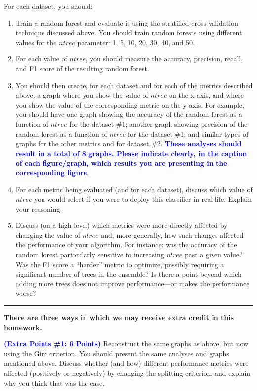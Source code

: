 \documentclass[letterpaper]{article}
\newcommand{\HIGHLIGHT}[1]{\textcolor{blue}{\textbf{#1}}}
\begin{document}
For each dataset, you should:

\begin{enumerate}
    \item Train a random forest and evaluate it using the stratified cross-validation technique discussed above. You should train random forests using different values for the $ntree$ parameter: 1, 5, 10, 20, 30, 40, and 50.
    \item For each value of $ntree$, you should measure the accuracy, precision, recall, and F1 score of the resulting random forest. 
    \item You should then create, for each dataset and for each of the metrics described above, a graph where you show the value of $ntree$ on the x-axis, and where you show the value of the corresponding metric on the y-axis. For example, you should have one graph showing the accuracy of the random forest as a function of $ntree$ for the dataset \#1; another graph showing precision of the random forest as a function of $ntree$ for the dataset \#1; and similar types of graphs for the other metrics and for dataset \#2. \HIGHLIGHT{These analyses should result in a total of 8 graphs. Please indicate clearly, in the caption of each figure/graph, which results you are presenting in the corresponding figure}.
    \item For each metric being evaluated (and for each dataset), discuss which value of $ntree$ you would select if you were to deploy this classifier in real life. Explain your reasoning. 
    \item Discuss (on a high level) which metrics were more directly affected by changing the value of $ntree$ and, more generally, how such changes affected the performance of your algorithm. For instance: was the accuracy of the random forest particularly sensitive to increasing $ntree$ past a given value? Was the F1 score a  ``harder'' metric to optimize, possibly requiring a significant number of trees in the ensemble? Is there a point beyond which adding more trees does not improve performance---or makes the performance worse?
\end{enumerate}

\vspace{1cm}
\noindent\rule{\textwidth}{1pt}

\textbf{There are three ways in which we may receive extra credit in this homework.}

\noindent \HIGHLIGHT{(Extra Points \#1: 6 Points)} Reconstruct the same graphs as above, but now using the Gini criterion. You should present the same analyses and graphs mentioned above. Discuss whether (and how) different performance metrics were affected (positively or negatively) by changing the splitting criterion, and explain why you think that was the case.
\end{document}
